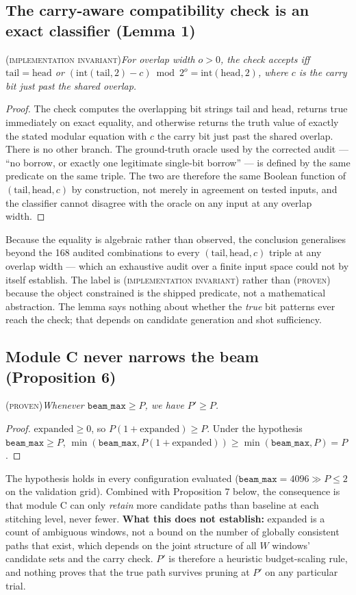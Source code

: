 \documentclass[preprint,11pt]{elsarticle}
\newcommand{\PROVEN}{\textsc{(proven)}}
\newcommand{\INVAR}{\textsc{(implementation invariant)}}
\newcommand{\beammax}{\texttt{beam\_max}}
\begin{document}
\subsection{The carry-aware compatibility check is an exact classifier (Lemma 1)}
\INVAR{}\quad\textit{For overlap width $o>0$, the check accepts iff
$\mathrm{tail}=\mathrm{head}$ or
$(\mathrm{int}(\mathrm{tail},2)-c)\bmod 2^{o}=\mathrm{int}(\mathrm{head},2)$,
where $c$ is the carry bit just past the shared overlap.}

\begin{proof}
The check computes the overlapping bit strings $\mathrm{tail}$ and
$\mathrm{head}$, returns true immediately on exact equality, and
otherwise returns the truth value of exactly the stated modular equation
with $c$ the carry bit just past the shared overlap. There is no other
branch. The ground-truth oracle used by the corrected audit --- ``no
borrow, or exactly one legitimate single-bit borrow'' --- is defined by
the same predicate on the same triple. The two are therefore the same
Boolean function of $(\mathrm{tail},\mathrm{head},c)$ by construction,
not merely in agreement on tested inputs, and the classifier cannot
disagree with the oracle on any input at any overlap width.
\end{proof}

\noindent
Because the equality is algebraic rather than observed, the conclusion
generalises beyond the 168 audited combinations to every
$(\mathrm{tail},\mathrm{head},c)$ triple at any overlap width --- which an
exhaustive audit over a finite input space could not by itself establish.
The label is \INVAR{} rather than \PROVEN{} because the object
constrained is the shipped predicate, not a mathematical abstraction. The
lemma says nothing about whether the \emph{true} bit patterns ever reach
the check; that depends on candidate generation and shot sufficiency.

\subsection{Module C never narrows the beam (Proposition 6)}
\PROVEN{}\quad\textit{Whenever $\beammax\ge P$, we have $P'\ge P$.}

\begin{proof}
$\mathrm{expanded}\ge0$, so $P(1+\mathrm{expanded})\ge P$. Under the
hypothesis $\beammax\ge P$,
$\min(\beammax,P(1+\mathrm{expanded}))\ge\min(\beammax,P)=P$.
\end{proof}

\noindent
The hypothesis holds in every configuration evaluated
($\beammax=4096\gg P\le2$ on the validation grid). Combined with
Proposition 7 below, the consequence is that module C can only
\emph{retain} more candidate paths than baseline at each stitching level,
never fewer. \textbf{What this does not establish:} $\mathrm{expanded}$
is a count of ambiguous windows, not a bound on the number of
globally consistent paths that exist, which depends on the joint
structure of all $W$ windows' candidate sets and the carry check. $P'$ is
therefore a heuristic budget-scaling rule, and nothing proves that the
true path survives pruning at $P'$ on any particular trial.
\end{document}
